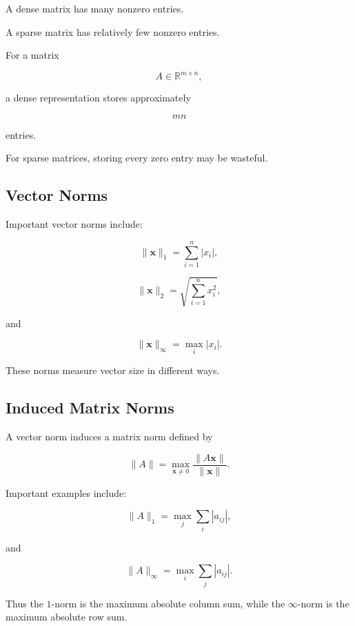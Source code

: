A dense matrix has many nonzero entries.

A sparse matrix has relatively few nonzero entries.

For a matrix

\[
A\in\mathbb{R}^{m\times n},
\]

a dense representation stores approximately

\[
\boxed{
mn
}
\]

entries.

For sparse matrices, storing every zero entry may be wasteful.

\subsection{Vector Norms}
\label{subsec:numerical-vector-norms}

Important vector norms include:

\[
\boxed{
\|\mathbf{x}\|_1
=
\sum_{i=1}^{n}
|x_i|,
}
\]

\[
\boxed{
\|\mathbf{x}\|_2
=
\sqrt{
\sum_{i=1}^{n}
x_i^2
},
}
\]

and

\[
\boxed{
\|\mathbf{x}\|_\infty
=
\max_i
|x_i|.
}
\]

These norms measure vector size in different ways.

\subsection{Induced Matrix Norms}
\label{subsec:induced-matrix-norms}

A vector norm induces a matrix norm defined by

\[
\boxed{
\|A\|
=
\max_{\mathbf{x}\neq0}
\frac{
\|A\mathbf{x}\|
}{
\|\mathbf{x}\|
}.
}
\]

Important examples include:

\[
\boxed{
\|A\|_1
=
\max_j
\sum_i
|a_{ij}|,
}
\]

and

\[
\boxed{
\|A\|_\infty
=
\max_i
\sum_j
|a_{ij}|.
}
\]

Thus the \(1\)-norm is the maximum absolute column sum, while the
\(\infty\)-norm is the maximum absolute row sum.

